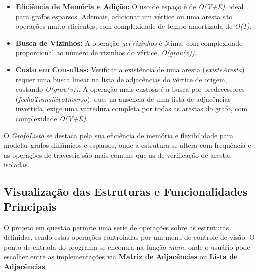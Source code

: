 \documentclass{sbc2023}%
\begin{document}
        \begin{itemize}
            \item \textbf{Eficiência de Memória e Adição:} O uso de espaço é de \textit{O(V+E)}, ideal para grafos esparsos. Ademais, adicionar um vértice ou uma aresta são operações muito eficientes, com complexidade de tempo amortizada de \textit{O(1)}.
            \item \textbf{Busca de Vizinhos:} A operação \textit{getVizinhos} é ótima, com complexidade proporcional ao número de vizinhos do vértice, \textit{O(grau(v))}.
            \item \textbf{Custo em Consultas:} Verificar a existência de uma aresta (\textit{existeAresta}) requer uma busca linear na lista de adjacências do vértice de origem, custando \textit{O(grau(v))}. A operação mais custosa é a busca por predecessores (\textit{fechoTransitivoInverso}), que, na ausência de uma lista de adjacências invertida, exige uma varredura completa por todas as arestas do grafo, com complexidade \textit{O(V+E)}.
        \end{itemize}
    
        O \textit{GrafoLista} se destaca pela sua eficiência de memória e flexibilidade para modelar grafos dinâmicos e esparsos, onde a estrutura se altera com frequência e as operações de travessia são mais comuns que as de verificação de arestas isoladas.

    \subsection{Visualização das Estruturas e Funcionalidades Principais}
    
    O projeto em questão permite uma serie de operações sobre as estruturas definidas, sendo estas operações controladas por um menu de controle de visão. O ponto de entrada do programa se encontra na função \textit{main}, onde o usuário pode escolher entre as implementações via \textbf{Matriz de Adjacências} ou \textbf{Lista de Adjacências}.


\end{document}
